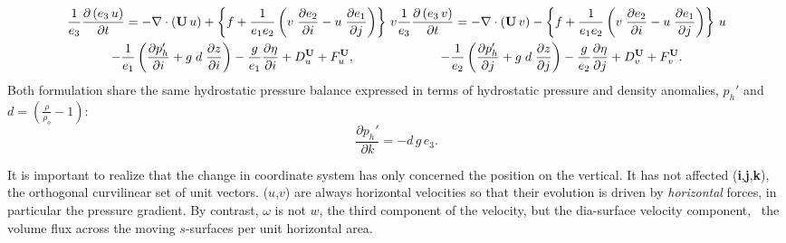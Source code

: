\documentclass[../main/NEMO_manual]{subfiles}
\begin{document}
\begin{subequations}
  \label{eq:SCOORD_dyn_flux}
  \begin{multline}
    \label{eq:SCOORD_PE_dyn_flux_u}
    \frac{1}{e_3} \frac{\partial \left(  e_3\,u  \right) }{\partial t} =
    - \nabla \cdot \left(   {{\mathrm {\mathbf U}}\,u}   \right)
    +   \left\{ {f + \frac{1}{e_1 e_2 }\left(    v  \;\frac{\partial e_2 }{\partial i}
          -u  \;\frac{\partial e_1 }{\partial j}            \right)} \right\} \,v     \\
    -   \frac{1}{e_1 } \left(    \frac{\partial p_h'}{\partial i} + g\; d  \; \frac{\partial z}{\partial i}    \right)
    -   \frac{g}{e_1 } \frac{\partial \eta}{\partial i}
    +   D_u^{\vect{U}}  +   F_u^{\vect{U}} ,
  \end{multline}
  \begin{multline}
    \label{eq:SCOORD_dyn_flux_v}
    \frac{1}{e_3}\frac{\partial \left(  e_3\,v  \right) }{\partial t}=
    -  \nabla \cdot \left(   {{\mathrm {\mathbf U}}\,v}   \right)
    -   \left\{ {f + \frac{1}{e_1 e_2 }\left(    v  \;\frac{\partial e_2 }{\partial i}
          -u  \;\frac{\partial e_1 }{\partial j}            \right)} \right\} \,u     \\
    -   \frac{1}{e_2 } \left(    \frac{\partial p_h'}{\partial j} + g\; d  \; \frac{\partial z}{\partial j}    \right)
    -   \frac{g}{e_2 } \frac{\partial \eta}{\partial j}
    +  D_v^{\vect{U}}  +   F_v^{\vect{U}} .
  \end{multline}
\end{subequations}
Both formulation share the same hydrostatic pressure balance expressed in terms of
hydrostatic pressure and density anomalies, $p_h'$ and $d=( \frac{\rho}{\rho_o}-1 )$:
\begin{equation}
  \label{eq:SCOORD_dyn_zph}
  \frac{\partial p_h'}{\partial k} = - d \, g \, e_3 .
\end{equation}

It is important to realize that the change in coordinate system has only concerned the position on the vertical.
It has not affected (\textbf{i},\textbf{j},\textbf{k}), the orthogonal curvilinear set of unit vectors.
($u$,$v$) are always horizontal velocities so that their evolution is driven by \emph{horizontal} forces,
in particular the pressure gradient.
By contrast, $\omega$ is not $w$, the third component of the velocity, but the dia-surface velocity component,
\ie\ the volume flux across the moving $s$-surfaces per unit horizontal area.

\end{document}
